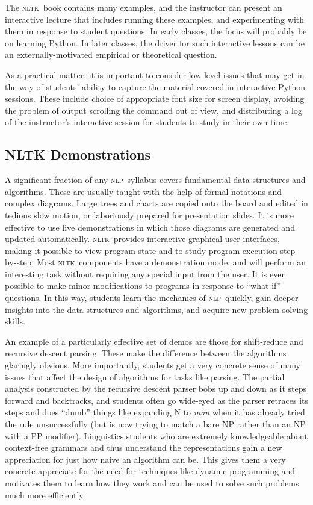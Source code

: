 \documentclass[11pt]{article}
\newcommand{\NLP}{\textsc{nlp}}
\newcommand{\NLTK}{\textsc{nltk}}
\begin{document}
The \NLTK\ book contains many examples, and the instructor
can present an interactive lecture that includes running these examples,
and experimenting with them in response to student questions.  In early
classes, the focus will probably be on learning Python.  In later classes,
the driver for such interactive lessons can be an externally-motivated
empirical or theoretical question.

As a practical matter, it is important to consider low-level issues
that may get in the way of students' ability to capture the material
covered in interactive Python sessions.  These include choice of
appropriate font size for screen display, avoiding the problem of output scrolling the
command out of view, and distributing a log of the instructor's interactive session
for students to study in their own time.


\subsection{NLTK Demonstrations}

A significant fraction of any \NLP\ syllabus covers fundamental data
structures and algorithms. These are usually taught with the help of
formal notations and complex diagrams. Large trees and charts are
copied onto the board and edited in tedious slow motion, or
laboriously prepared for presentation slides. It is more effective to
use live demonstrations in which those diagrams are generated and
updated automatically. \NLTK\ provides interactive graphical user
interfaces, making it possible to view program state and to study
program execution step-by-step. Most \NLTK\ components have a
demonstration mode, and will perform an interesting task without
requiring any special input from the user. It is even possible to make
minor modifications to programs in response to ``what if'' questions. In
this way, students learn the mechanics of \NLP\ quickly, gain deeper
insights into the data structures and algorithms, and acquire new
problem-solving skills.

An example of a particularly effective set of demos are those for
shift-reduce and recursive descent parsing. These make the difference
between the algorithms glaringly obvious. More importantly, students
get a very concrete sense of many issues that affect the design of
algorithms for tasks like parsing. The partial analysis constructed by
the recursive descent parser bobs up and down as it steps forward and
backtracks, and students often go wide-eyed as the parser retraces its
steps and does ``dumb'' things like expanding N to {\it man} when it
has already tried the rule unsuccessfully (but is now trying to match
a bare NP rather than an NP with a PP modifier). Linguistics students
who are extremely knowledgeable about context-free grammars and thus
understand the representations gain a new appreciation for just how
naive an algorithm can be. This gives them a very concrete appreciate
for the need for techniques like dynamic programming and motivates
them to learn how they work and can be used to solve such problems
much more efficiently.
\end{document}
